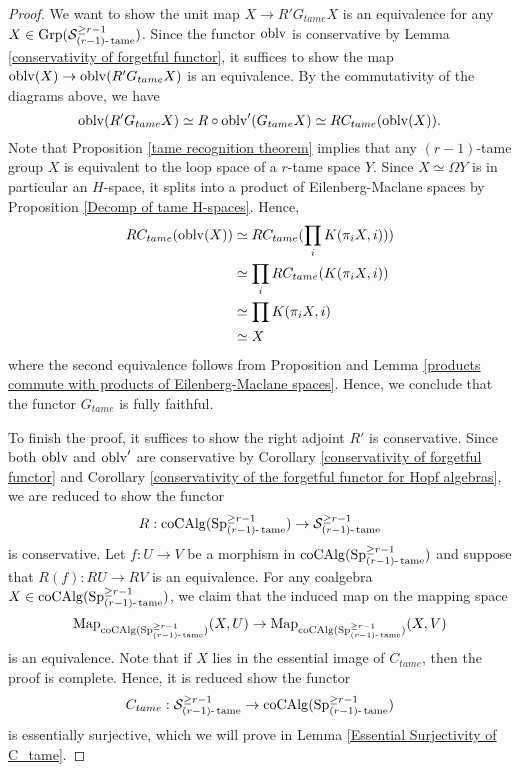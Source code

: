 \begin{proof}
We want to show the unit map $X \to R' G_{tame}X$ is an equivalence for any $X\in \operatorname{Grp}({\mathcal{S}}^{\geq r-1}_{(r-1)\text{-}\operatorname{\operatorname{tame}}})$.
Since the functor $\operatorname{oblv}$ is conservative by Lemma \ref{conservativity of forgetful functor}, it suffices to show the map $\operatorname{oblv}(X) \to \operatorname{oblv}(R'G_{tame}X)$ is an equivalence.
By the commutativity of the diagrams above, we have
$$
\operatorname{oblv}(R'G_{tame}X) \simeq R \circ \operatorname{oblv}'(G_{tame}X)\simeq RC_{tame}(\operatorname{oblv}(X)).
$$
	Note that Proposition \ref{tame recognition theorem} implies that any  $(r-1)$-tame group $X$ is equivalent to the loop space of a $r$-tame space $Y$. Since $X\simeq \Omega Y$ is in particular an $H$-space, it splits into a product of Eilenberg-Maclane spaces by Proposition \ref{Decomp of tame H-spaces}. Hence, 
		\begin{align*}
		RC_{tame}(\operatorname{oblv}(X)) & \simeq RC_{tame}(\prod_{i} K(\pi_i X, i)))\\
		& \simeq \prod_{i} RC_{tame}(K(\pi_i X, i))\\
		& \simeq \prod K(\pi_i X, i)\\
		& \simeq X
	\end{align*}
	where the second equivalence follows from Proposition  and Lemma \ref{products commute with products of Eilenberg-Maclane spaces}.
	Hence, we conclude that the functor $G_{tame}$ is fully faithful.
	
	To finish the proof, it suffices to show the right adjoint $R'$ is conservative. 
	Since both $\operatorname{oblv}$ and $\operatorname{oblv}'$ are conservative by Corollary \ref{conservativity of forgetful functor} and Corollary \ref{conservativity of the forgetful functor for Hopf algebras}, we are reduced to show the functor 
	\[
	R: \operatorname{coCAlg}(\operatorname{Sp}^{\geq r-1}_{(r-1)\text{-}\operatorname{\operatorname{tame}}}) \to 
	{\mathcal{S}}^{\geq r-1}_{(r-1)\text{-}\operatorname{\operatorname{tame}}}
	\]
	is conservative. Let $f:U\to V$ be a morphism in $\operatorname{coCAlg}(\operatorname{Sp}^{\geq r-1}_{(r-1)\text{-}\operatorname{\operatorname{tame}}})$ and suppose that $R(f): RU\to RV$ is an equivalence.
	For any coalgebra $X\in \operatorname{coCAlg}(\operatorname{Sp}^{\geq r-1}_{(r-1)\text{-}\operatorname{\operatorname{tame}}})$, we claim that the induced map on the mapping space
	$$
	\operatorname{Map}_{\operatorname{coCAlg}(\operatorname{Sp}^{\geq r-1}_{(r-1)\text{-}\operatorname{\operatorname{tame}}})}(X, U)\to 
	\operatorname{Map}_{\operatorname{coCAlg}(\operatorname{Sp}^{\geq r-1}_{(r-1)\text{-}\operatorname{\operatorname{tame}}})}(X, V)
	$$
	is an equivalence.
	Note that if $X$ lies in the essential image of $C_{tame}$, then the proof is complete. Hence, it is reduced show the functor
	$$
	C_{tame}: {\mathcal{S}}^{\geq r-1}_{(r-1)\text{-}\operatorname{\operatorname{tame}}}  
	\to 
	\operatorname{coCAlg}(\operatorname{Sp}^{\geq r-1}_{(r-1)\text{-}\operatorname{\operatorname{tame}}})
	$$
	is essentially surjective, which we will prove in Lemma \ref{Essential Surjectivity of C_tame}.
	
\end{proof}



